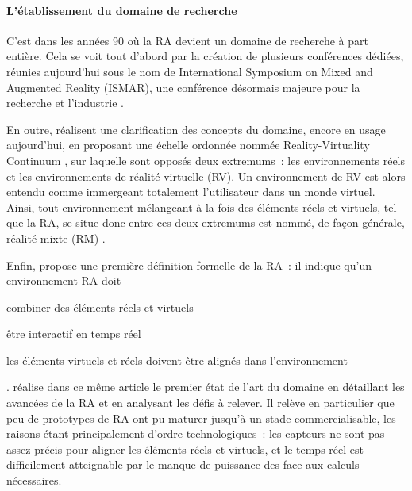 \paragraph*{L'établissement du domaine de recherche}
C'est dans les années 90 où la RA devient un domaine de recherche à part entière. Cela se voit tout d'abord par la création de plusieurs conférences dédiées, réunies aujourd'hui sous le nom de International Symposium on Mixed and Augmented Reality (ISMAR), une conférence désormais majeure pour la recherche et l'industrie \citep{AzumaBaillotBehringerEtAl2001}.

En outre, \citet{MilgramKishino1994} réalisent une clarification des concepts du domaine, encore en usage aujourd'hui, en proposant une échelle ordonnée nommée \foreignlanguage{english}{Reality-Virtuality Continuum} , sur laquelle sont opposés deux extremums~: les environnements réels et les environnements de réalité virtuelle (RV). Un environnement de RV est alors entendu comme immergeant totalement l'utilisateur dans un monde virtuel. Ainsi, tout environnement mélangeant à la fois des éléments réels et virtuels, tel que la RA, se situe donc entre ces deux extremums est nommé, de façon générale, réalité mixte (RM) \citep{MilgramKishino1994}.

Enfin, \citet{Azuma1997} propose une première définition formelle de la RA~: il indique qu'un environnement RA doit 
\begin{enumerate*}[label=\emph{\arabic*})]
	\item combiner des éléments réels et virtuels
	\item être interactif en temps réel
	\item les éléments virtuels et réels doivent être alignés dans l'environnement
\end{enumerate*}. 
\citeauthor{Azuma1997} réalise dans ce même article le premier état de l'art du domaine en détaillant les avancées de la RA et en analysant les défis à relever. Il relève en particulier que peu de prototypes de RA ont pu maturer jusqu'à un stade commercialisable, les raisons étant principalement d'ordre technologiques~: les capteurs ne sont pas assez précis pour aligner les éléments réels et virtuels, et le temps réel est difficilement atteignable par le manque de puissance des face aux calculs nécessaires.


